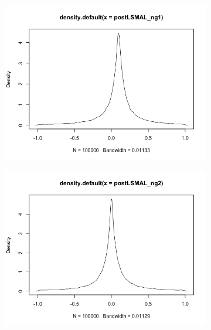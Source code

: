 \documentclass[mstat,12pt]{unswthesis}  %
\numberwithin{equation}{section}
\begin{document}
\newpage
\begin{figure}[h]
\centering
\begin{subfigure}{.32\textwidth}
  \centering
  \includegraphics[width=\linewidth]{postLSMALng1.png}  
  \label{fig:sub-first}
\end{subfigure}
\begin{subfigure}{.32\textwidth}
  \centering
  \includegraphics[width=\linewidth]{postLSMALng2.png}  
  \label{fig:sub-second}
\end{subfigure}


\end{figure}
\end{document}
